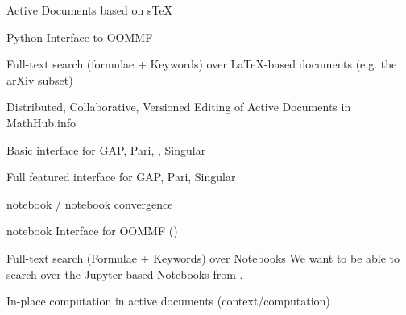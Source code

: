 \begin{workpackage}
\begin{wpdelivs}
  \begin{wpdeliv}[id=adstex,due=6,nature=R,dissem=PU]
    {Active Documents based on sTeX}
  \end{wpdeliv}
  \begin{wpdeliv}[due=9,id=oommf-py,dissem=PU,nature=O]
      {Python Interface to OOMMF}
    \end{wpdeliv}
    \begin{wpdeliv}[id=mws,due=9,nature=O,dissem=PU]
      {Full-text search (formulae + Keywords) over LaTeX-based documents
        (e.g. the arXiv subset)}
    \end{wpdeliv}
    \begin{wpdeliv}[id=mathhub-editing,due=12,nature=DEM,dissem=PU]
      {Distributed, Collaborative, Versioned Editing of Active Documents
        in MathHub.info}
    \end{wpdeliv}
  \begin{wpdeliv}[due=12,id=ipython-kernels-basic,dissem=PU,nature=O]
      {Basic \Jupyter interface for GAP, Pari, \Sage, Singular}
  \end{wpdeliv}

  \begin{wpdeliv}[due=12,id=ipython-kernels,dissem=PU,nature=O]
      {Full featured \Jupyter interface for GAP, Pari, Singular}
  \end{wpdeliv}

  \begin{wpdeliv}[due=12,id=ipython-kernel-sage,dissem=PU,nature=DEM]
      {\Sage notebook / \Jupyter notebook convergence}
  \end{wpdeliv}

    \begin{wpdeliv}[due=15,id=oommf-nb,dissem=PU,nature=DEM]
      {\Jupyter notebook Interface for OOMMF (\OOMMFNB{})}
    \end{wpdeliv}

    \begin{wpdeliv}[id=notebooksearch,due=18,nature=O,dissem=PU]
      {Full-text search (Formulae + Keywords) over Notebooks}
      We want to be able to search over the Jupyter-based Notebooks from
      .
\end{wpdeliv}

    \begin{wpdeliv}[id=adcomp,due=18,nature=DEM,dissem=PU]
      {In-place computation in active documents (context/computation)}
    \end{wpdeliv}


\end{wpdelivs}
\end{workpackage}
